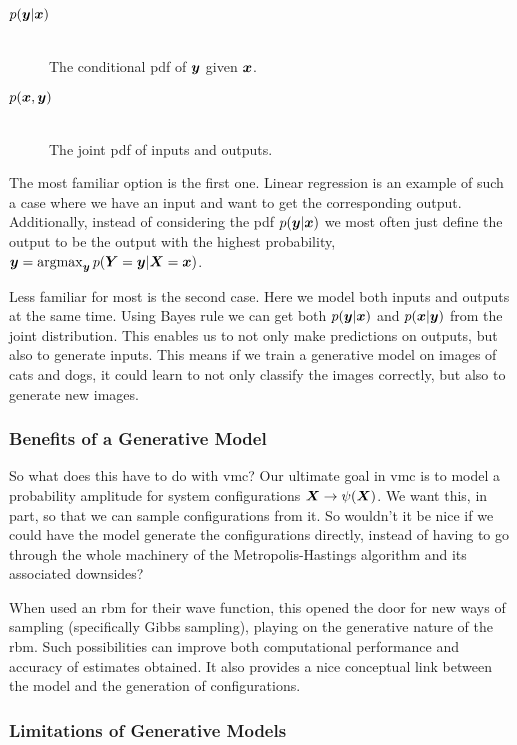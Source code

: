 \documentclass[Thesis.tex]{subfiles}
\begin{document}
\begin{description}
\item[$p(\bm{y} | \bm{x})$]\hfill\\
  The conditional \gls{pdf} of $\bm{y}$ given $\bm{x}$.
\item[$p(\bm{x}, \bm{y})$] \hfill\\
  The joint \gls{pdf} of inputs and outputs.
\end{description}
The most familiar option is the first one. Linear regression is an example of
such a case where we have an input and want to get the corresponding output.
Additionally, instead of considering the \gls{pdf} $p(\bm{y}|\bm{x})$ we
most often just define the output to be the output with the highest probability,
$\bm{y} = \operatorname*{argmax}_{\bm{y}}p(\bm{Y} = \bm{y} | \bm{X} = \bm{x})$.

Less familiar for most is the second case. Here we model both inputs and outputs
at the same time. Using Bayes rule we can get both $p(\bm{y}|\bm{x})$ and $p(\bm{x} |
\bm{y})$ from the joint distribution. This enables us to not only make predictions on
outputs, but also to generate inputs. This means if we train a generative model
on images of cats and dogs, it could learn to not only classify the images
correctly, but also to generate new images.

\subsubsection{Benefits of a Generative Model}

So what does this have to do with \gls{vmc}? Our ultimate
goal in \gls{vmc} is to model a probability amplitude for system configurations
$\bm{X}\rightarrow \psi(\bm{X})$. We want this, in part, so that we can sample
configurations from it. So wouldn't it be nice if we could have the model
generate the configurations directly, instead of having to go through the whole
machinery of the Metropolis-Hastings algorithm and its associated downsides?

When \textcite{Carleo602} used an \gls{rbm} for their wave function, this opened the
door for new ways of sampling (specifically Gibbs sampling), playing on the
generative nature of the \gls{rbm}. Such possibilities can improve both computational
performance and accuracy of estimates obtained. It also provides a nice
conceptual link between the model and the generation of configurations.

\subsubsection{Limitations of Generative Models}
\end{document}

